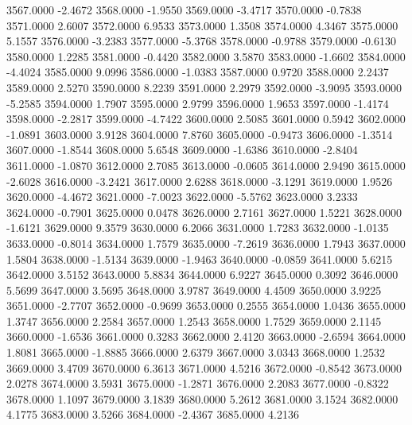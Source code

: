 3567.0000     -2.4672
3568.0000     -1.9550
3569.0000     -3.4717
3570.0000     -0.7838
3571.0000      2.6007
3572.0000      6.9533
3573.0000      1.3508
3574.0000      4.3467
3575.0000      5.1557
3576.0000     -3.2383
3577.0000     -5.3768
3578.0000     -0.9788
3579.0000     -0.6130
3580.0000      1.2285
3581.0000     -0.4420
3582.0000      3.5870
3583.0000     -1.6602
3584.0000     -4.4024
3585.0000      9.0996
3586.0000     -1.0383
3587.0000      0.9720
3588.0000      2.2437
3589.0000      2.5270
3590.0000      8.2239
3591.0000      2.2979
3592.0000     -3.9095
3593.0000     -5.2585
3594.0000      1.7907
3595.0000      2.9799
3596.0000      1.9653
3597.0000     -1.4174
3598.0000     -2.2817
3599.0000     -4.7422
3600.0000      2.5085
3601.0000      0.5942
3602.0000     -1.0891
3603.0000      3.9128
3604.0000      7.8760
3605.0000     -0.9473
3606.0000     -1.3514
3607.0000     -1.8544
3608.0000      5.6548
3609.0000     -1.6386
3610.0000     -2.8404
3611.0000     -1.0870
3612.0000      2.7085
3613.0000     -0.0605
3614.0000      2.9490
3615.0000     -2.6028
3616.0000     -3.2421
3617.0000      2.6288
3618.0000     -3.1291
3619.0000      1.9526
3620.0000     -4.4672
3621.0000     -7.0023
3622.0000     -5.5762
3623.0000      3.2333
3624.0000     -0.7901
3625.0000      0.0478
3626.0000      2.7161
3627.0000      1.5221
3628.0000     -1.6121
3629.0000      9.3579
3630.0000      6.2066
3631.0000      1.7283
3632.0000     -1.0135
3633.0000     -0.8014
3634.0000      1.7579
3635.0000     -7.2619
3636.0000      1.7943
3637.0000      1.5804
3638.0000     -1.5134
3639.0000     -1.9463
3640.0000     -0.0859
3641.0000      5.6215
3642.0000      3.5152
3643.0000      5.8834
3644.0000      6.9227
3645.0000      0.3092
3646.0000      5.5699
3647.0000      3.5695
3648.0000      3.9787
3649.0000      4.4509
3650.0000      3.9225
3651.0000     -2.7707
3652.0000     -0.9699
3653.0000      0.2555
3654.0000      1.0436
3655.0000      1.3747
3656.0000      2.2584
3657.0000      1.2543
3658.0000      1.7529
3659.0000      2.1145
3660.0000     -1.6536
3661.0000      0.3283
3662.0000      2.4120
3663.0000     -2.6594
3664.0000      1.8081
3665.0000     -1.8885
3666.0000      2.6379
3667.0000      3.0343
3668.0000      1.2532
3669.0000      3.4709
3670.0000      6.3613
3671.0000      4.5216
3672.0000     -0.8542
3673.0000      2.0278
3674.0000      3.5931
3675.0000     -1.2871
3676.0000      2.2083
3677.0000     -0.8322
3678.0000      1.1097
3679.0000      3.1839
3680.0000      5.2612
3681.0000      3.1524
3682.0000      4.1775
3683.0000      3.5266
3684.0000     -2.4367
3685.0000      4.2136
